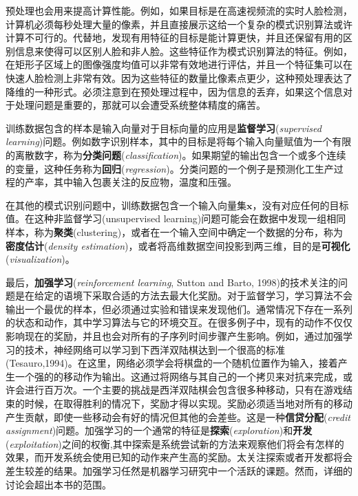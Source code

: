 	预处理也会用来提高计算性能。例如，如果目标是在高速视频流的实时人脸检测，计算机必须每秒处理大量的像素，并且直接展示这给一个复杂的模式识别算法或许计算不可行的。代替地，发现有用特征的目标是能计算更快，并且还保留有用的区别信息来使得可以区别人脸和非人脸。这些特征作为模式识别算法的特征。例如，在矩形子区域上的图像强度均值可以非常有效地进行评估，并且一个特征集可以在快速人脸检测上非常有效。因为这些特征的数量比像素点更少，这种预处理表达了降维的一种形式。必须注意到在预处理过程中，因为信息的丢弃，如果这个信息对于处理问题是重要的，那就可以会遭受系统整体精度的痛苦。
	
	训练数据包含的样本是输入向量对于目标向量的应用是\textbf{监督学习}(\textit{supervised learning})问题。例如数字识别样本，其中的目标是将每个输入向量赋值为一个有限的离散数字，称为\textbf{分类问题}(\textit{classification})。如果期望的输出包含一个或多个连续的变量，这种任务称为\textbf{回归}(\textit{regression})。分类问题的一个例子是预测化工生产过程的产率，其中输入包裹关注的反应物，温度和压强。
	
	在其他的模式识别问题中，训练数据包含一个输入向量集$\mathbf{x}$，没有对应任何的目标值。在这种非监督学习(unsupervised learning)问题可能会在数据中发现一组相同样本，称为\textbf{聚类}(clustering)，或者在一个输入空间中确定一个数据的分布，称为\textbf{密度估计}(\textit{density estimation})，或者将高维数据空间投影到两三维，目的是\textbf{可视化}(\textit{visualization})。
	
	最后，\textbf{加强学习}(\textit{reinforcement learning}, Sutton and Barto, 1998)的技术关注的问题是在给定的语境下采取合适的方法去最大化奖励。对于监督学习，学习算法不会输出一个最优的样本，但必须通过实验和错误来发现他们。通常情况下存在一系列的状态和动作，其中学习算法与它的环境交互。在很多例子中，现有的动作不仅仅影响现在的奖励，并且也会对所有的子序列时间步骤产生影响。例如，通过加强学习的技术，神经网络可以学习到下西洋双陆棋达到一个很高的标准(Tesauro,1994)。在这里，网络必须学会将棋盘的一个随机位置作为输入，接着产生一个强的的移动作为输出。这通过将网络与其自己的一个拷贝来对抗来完成，或许会进行百万次。一个主要的挑战是西洋双陆棋会包含很多种移动，只有在游戏结束的时候，在取得胜利的情况下，奖励才得以实现。奖励必须适当地对所有的移动产生贡献，即使一些移动会有好的情况但其他的会差些。这是一种\textbf{信贷分配}(\textit{credit assignment})问题。加强学习的一个通常的特征是\textbf{探索}(\textit{exploration})和\textbf{开发}(\textit{exploitation})之间的权衡,其中探索是系统尝试新的方法来观察他们将会有怎样的效果，而开发系统会使用已知的动作来产生高的奖励。太关注探索或者开发都将会差生较差的结果。加强学习任然是机器学习研究中一个活跃的课题。然而，详细的讨论会超出本书的范围。
	
